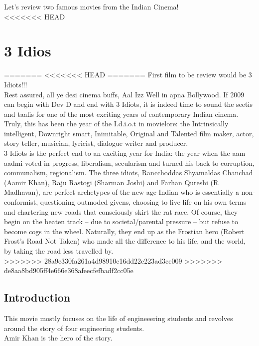 \documentclass{article}
\begin{document}
Let's review two famous movies from the Indian Cinema!\\
<<<<<<< HEAD
\section{3 Idios}
=======
<<<<<<< HEAD
=======
First film to be  review would be 3 Idiots!!! \\
Rest assured, all ye desi cinema buffs, Aal Izz Well in apna Bollywood. If 2009 can begin with Dev D and end with 3 Idiots, it is indeed time to sound the seetis and taalis for one of the most exciting years of contemporary Indian cinema. Truly, this has been the year of the I.d.i.o.t in movielore: the Intrinsically intelligent, Downright smart, Inimitable, Original and Talented film maker, actor, story teller, musician, lyricist, dialogue writer and producer.\\

3 Idiots is the perfect end to an exciting year for India: the year when the aam aadmi voted in progress, liberalism, secularism and turned his back to corruption, communalism, regionalism. The three idiots, Rancchoddas Shyamaldas Chanchad (Aamir Khan), Raju Rastogi (Sharman Joshi) and Farhan Qureshi (R Madhavan), are perfect archetypes of the new age Indian who is essentially a non-conformist, questioning outmoded givens, choosing to live life on his own terms and chartering new roads that consciously skirt the rat race. Of course, they begin on the beaten track -- due to societal/parental pressure -- but refuse to become cogs in the wheel. Naturally, they end up as the Frostian hero (Robert Frost's Road Not Taken) who made all the difference to his life, and the world, by taking the road less travelled by.\\

>>>>>>> 28a9e330fa261a4d98910c16dd22e223ad3ce009
>>>>>>> de8aa8bd905ff4e666e368afeecfefbadf2cc05e

\subsection{Introduction}
This movie mostly focuses on the life of engineeering students and revolves around the story of four engineering students. \\
Amir Khan is the hero of the story. \\
\end{document}
